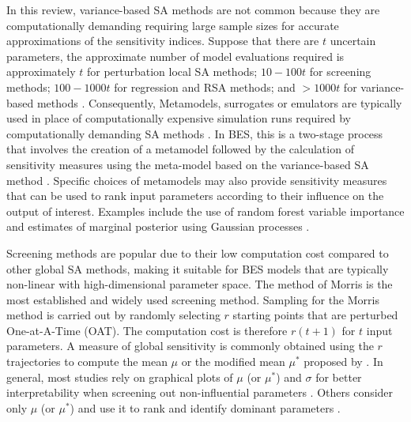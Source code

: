 \documentclass[review]{elsarticle}
\begin{document}
In this review, variance-based SA methods are not common because they are computationally demanding requiring large sample sizes for accurate approximations of the sensitivity indices. Suppose that there are $t$ uncertain parameters, the approximate number of model evaluations required is approximately $t$ for perturbation local SA methods; $10-100 t$ for screening methods; $100-1000 t$ for regression and RSA methods; and $>1000t$ for variance-based methods \cite{pianosi2016sensitivity}. Consequently, Metamodels, surrogates or emulators are typically used in place of computationally expensive simulation runs required by computationally demanding SA methods \cite{pianosi2016sensitivity}. In BES, this is a two-stage process that involves the creation of a metamodel followed by the calculation of sensitivity measures using the meta-model based on the variance-based SA method \cite{tian2013review}. Specific choices of metamodels may also provide sensitivity measures that can be used to rank input parameters according to their influence on the output of interest. Examples include the use of random forest variable importance \cite{tian2016identifying, lim2017comprehensive, lim2018influences} and estimates of marginal posterior using Gaussian processes \cite{yuan2017simultaneous}.

Screening methods are popular due to their low computation cost compared to other global SA methods, making it suitable for BES models that are typically non-linear with high-dimensional parameter space. The method of Morris \cite{morris1991factorial} is the most established and widely used screening method. Sampling for the Morris method is carried out by randomly selecting $r$ starting points that are perturbed One-at-A-Time (OAT). The computation cost is therefore $r(t+1)$ for $t$ input parameters. A measure of global sensitivity is commonly obtained using the $r$ trajectories to compute the mean $\mu$ \cite{morris1991factorial} or the modified mean $\mu^*$ proposed by \cite{campolongo2007effective}. In general, most studies rely on graphical plots of $\mu$ (or $\mu^*$) and $\sigma$ for better interpretability when screening out non-influential parameters \cite{martinez2019energy, kristensen2018hierarchical, chong2017bayesian, chong2018guidelines, chong2019continuous,li2018stepwise, kim2016development, ramosruiz2016genetic, yang2015model, zuhaib2019application, larochellemartin2019energy, martinez2020model, ferrara2020optimizing}. Others consider only $\mu$ (or $\mu^*$) and use it to rank and identify dominant parameters \cite{heo2015evaluation, chen2019district, wang2020bayesian, zhang2020development, giuliani2016modeling, roberti2015calibrating}.
\end{document}
